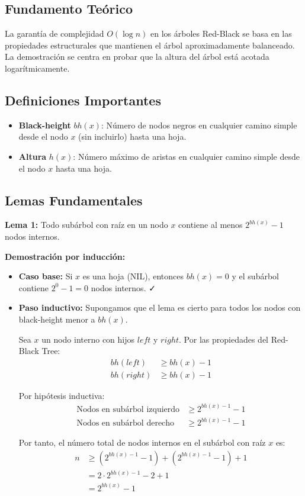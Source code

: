 \documentclass[conference]{IEEEtran}
\begin{document}
\subsection{Fundamento Teórico}

La garantía de complejidad $O(\log n)$ en los árboles Red-Black se basa en las propiedades estructurales que mantienen el árbol aproximadamente balanceado. La demostración se centra en probar que la altura del árbol está acotada logarítmicamente.

\subsection{Definiciones Importantes}

\begin{itemize}
    \item \textbf{Black-height} $bh(x)$: Número de nodos negros en cualquier camino simple desde el nodo $x$ (sin incluirlo) hasta una hoja.
    \item \textbf{Altura} $h(x)$: Número máximo de aristas en cualquier camino simple desde el nodo $x$ hasta una hoja.
\end{itemize}

\subsection{Lemas Fundamentales}

\textbf{Lema 1:} Todo subárbol con raíz en un nodo $x$ contiene al menos $2^{bh(x)} - 1$ nodos internos.

\textbf{Demostración por inducción:}
\begin{itemize}
    \item \textbf{Caso base:} Si $x$ es una hoja (NIL), entonces $bh(x) = 0$ y el subárbol contiene $2^0 - 1 = 0$ nodos internos. ✓
    
    \item \textbf{Paso inductivo:} Supongamos que el lema es cierto para todos los nodos con black-height menor a $bh(x)$.
    
    Sea $x$ un nodo interno con hijos $left$ y $right$. Por las propiedades del Red-Black Tree:
    \begin{align}
    bh(left) &\geq bh(x) - 1 \\
    bh(right) &\geq bh(x) - 1
    \end{align}
    
    Por hipótesis inductiva:
    \begin{align}
    \text{Nodos en subárbol izquierdo} &\geq 2^{bh(x)-1} - 1 \\
    \text{Nodos en subárbol derecho} &\geq 2^{bh(x)-1} - 1
    \end{align}
    
    Por tanto, el número total de nodos internos en el subárbol con raíz $x$ es:
    \begin{align}
    n &\geq (2^{bh(x)-1} - 1) + (2^{bh(x)-1} - 1) + 1 \\
    &= 2 \cdot 2^{bh(x)-1} - 2 + 1 \\
    &= 2^{bh(x)} - 1
    \end{align}
\end{itemize}
\end{document}
